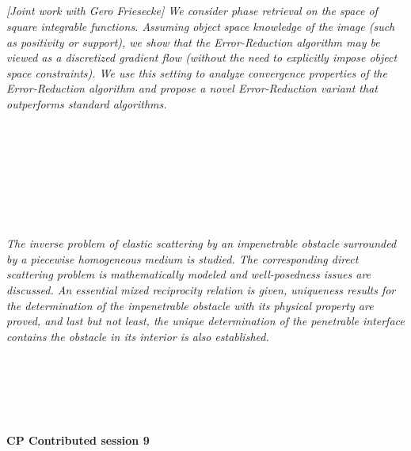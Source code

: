 \begin{multicols}{2}
        \\
        \\\\
\\
      \textit{[Joint work with Gero Friesecke] We consider phase retrieval on the space of square integrable functions. Assuming object space knowledge of the image (such as positivity or support), we show that the Error-Reduction algorithm may be viewed as a discretized gradient flow (without the need to explicitly impose object space constraints). We use this setting to analyze convergence properties of the Error-Reduction algorithm and propose a novel Error-Reduction variant that outperforms standard algorithms.}\\
\\ 
        \\
        \\\\
        \\
        \\\\
\\
      \textit{The inverse problem of elastic scattering by an impenetrable obstacle surrounded by a piecewise homogeneous medium is studied. The corresponding direct scattering problem is mathematically modeled and well-posedness issues are discussed. An essential mixed reciprocity relation is given, uniqueness results for the determination of the impenetrable obstacle with its physical property are proved, and last but not least, the unique determination of the penetrable interface contains the obstacle in its interior is also established.     
 }\\
\\ 
        \\
        \\\\
\\
\end{multicols}
  \noindent\textbf{CP Contributed session 9}\\
  \textit{} \\
    
